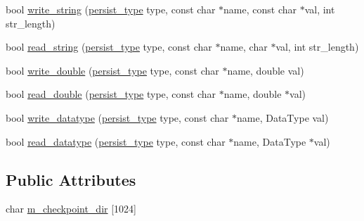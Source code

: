 \begin{DoxyCompactItemize}
\item 
bool \hyperlink{classlbann_1_1persist_a04afef84e7caa8509e65367225ceeba5}{write\+\_\+string} (\hyperlink{namespacelbann_adee41f31f15f3906cbdcce4a1417eb56}{persist\+\_\+type} type, const char $\ast$name, const char $\ast$val, int str\+\_\+length)
\item 
bool \hyperlink{classlbann_1_1persist_a19c0a5dbee697aff0a5a5588f2d370b9}{read\+\_\+string} (\hyperlink{namespacelbann_adee41f31f15f3906cbdcce4a1417eb56}{persist\+\_\+type} type, const char $\ast$name, char $\ast$val, int str\+\_\+length)
\item 
bool \hyperlink{classlbann_1_1persist_ad29ebcbacdef90a91a9d474d4d6e1bcd}{write\+\_\+double} (\hyperlink{namespacelbann_adee41f31f15f3906cbdcce4a1417eb56}{persist\+\_\+type} type, const char $\ast$name, double val)
\item 
bool \hyperlink{classlbann_1_1persist_ae3a0b96ece72901bb0a05d26a4eb4791}{read\+\_\+double} (\hyperlink{namespacelbann_adee41f31f15f3906cbdcce4a1417eb56}{persist\+\_\+type} type, const char $\ast$name, double $\ast$val)
\item 
bool \hyperlink{classlbann_1_1persist_a5edc3f9cc3540b50d417993da2a6b5ce}{write\+\_\+datatype} (\hyperlink{namespacelbann_adee41f31f15f3906cbdcce4a1417eb56}{persist\+\_\+type} type, const char $\ast$name, Data\+Type val)
\item 
bool \hyperlink{classlbann_1_1persist_a1e84eff891affad6001f3c5fa803cae2}{read\+\_\+datatype} (\hyperlink{namespacelbann_adee41f31f15f3906cbdcce4a1417eb56}{persist\+\_\+type} type, const char $\ast$name, Data\+Type $\ast$val)
\end{DoxyCompactItemize}
\subsection*{Public Attributes}
\begin{DoxyCompactItemize}
\item 
char \hyperlink{classlbann_1_1persist_a17c2b08ec1815aba6d3eae6502397bb1}{m\+\_\+checkpoint\+\_\+dir} \mbox{[}1024\mbox{]}
\end{DoxyCompactItemize}
